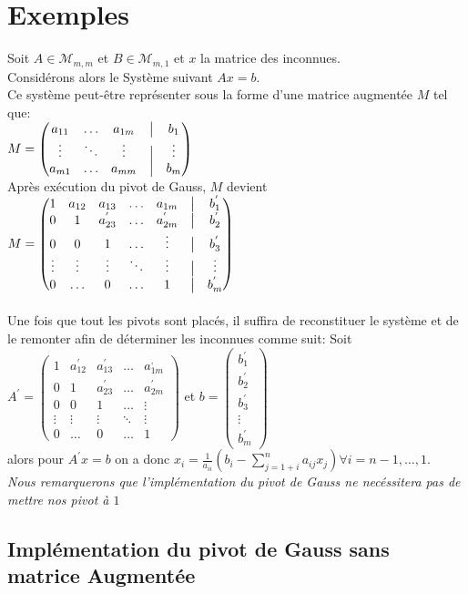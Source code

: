 \section{Exemples}
Soit $A \in \mathcal{M}_{m,m}$ et $B \in \mathcal{M}_{m,1}$ et $x$ la matrice des inconnues. \\
Considérons alors le Système suivant $Ax=b$.\\
Ce système peut-être représenter sous la forme d'une matrice augmentée $M$ tel que:\\
$
M =  \begin{pmatrix}
a_{11}& \ldots & a_{1m} &\bigm| & b_{1} \\
\vdots & \ddots & \vdots&\bigm| &  \vdots \\
a_{m1} & \ldots & a_{mm} &\bigm|& b_{m} 
\end{pmatrix}
$
\\
Après exécution du pivot de Gauss, $M$ devient \\
$
M =  \begin{pmatrix}
1& a_{12}& a_{13} &\ldots & a_{1m} &\bigm| & b_{1}^{'} \\
0 & 1 & a_{23}^{'}&  \ldots &a_{2m}^{'} &\bigm| & b_{2}^{'} \\
0 & 0 & 1 & \ldots &\vdots &\bigm| & b_{3}^{'} \\
\vdots & \vdots & \vdots& \ddots& \vdots &\bigm| &  \vdots \\
0 & \ldots &0 &\ldots &1&\bigm|& b_{m}^{'}
\end{pmatrix}
$  \\ \\
Une fois que tout les pivots sont placés, il suffira de reconstituer le système et de le remonter afin de déterminer les inconnues comme suit:
Soit $A^{'}=  \begin{pmatrix}
1& a_{12}^{'}& a_{13}^{'} &\ldots & a_{1m}^{,} \\
0 & 1 & a_{23}^{'}&  \ldots &a_{2m}^{'} \\
0 & 0 & 1 & \ldots &\vdots\\
\vdots & \vdots & \vdots& \ddots& \vdots \\
0 & \ldots &0 &\ldots &1
\end{pmatrix}
$
et $b = \begin{pmatrix}
b_{1}^{'} \\
b_{2}^{'} \\
b_{3}^{'} \\
\vdots \\
 b_{m}^{'}
\end{pmatrix}
$
\\
alors pour $A^{'}x = b$ on a donc $x_i = \frac{1}{a_{ii}}\left( b_i-\sum\limits_{j=1+i}^n a_{ij}x_j \right) \forall i = n-1, \ldots, 1$. \\
\textit{Nous remarquerons que l'implémentation du pivot de Gauss ne necéssitera pas de mettre nos pivot à $1$}
\subsection{Implémentation du pivot de Gauss sans matrice Augmentée}
% 

